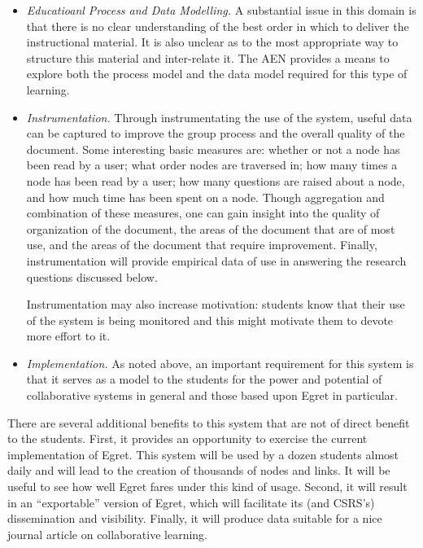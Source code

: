 \begin{itemize}
\item {\em Educatioanl Process and Data Modelling.} A substantial
  issue in this domain is that there is no clear understanding of the
  best order in which to deliver the instructional material.  It is
  also unclear as to the most appropriate way to structure this
  material and inter-relate it.  The AEN provides a means to explore
  both the process model and the data model required for this type of learning.
  
\item {\em Instrumentation.} Through instrumentating the use of the system,
  useful data can be captured to improve the group process and the overall
  quality of the document.  Some interesting basic measures are: whether or
  not a node has been read by a user; what order nodes are traversed in; how
  many times a node has been read by a user; how many questions are raised
  about a node, and how much time has been spent on a node. Though
  aggregation and combination of these measures, one can gain insight into
  the quality of organization of the document, the areas of the document that
  are of most use, and the areas of the document that require
  improvement.  Finally, instrumentation will provide empirical data
  of use in answering the research questions discussed below. 
  
  Instrumentation may also increase motivation: students know that
  their use of the system is being monitored and this might motivate
  them to devote more effort to it.
  
\item {\em Implementation.} As noted above, an important requirement for this
  system is that it serves as a model to the students for the power and
  potential of collaborative systems in general and those based upon Egret
  in particular.   


\end{itemize}

There are several additional benefits to this system that are not of direct
benefit to the students. First, it provides an opportunity to exercise the
current implementation of Egret.  This system will be used by a dozen
students almost daily and will lead to the creation of thousands of nodes
and links.  It will be useful to see how well Egret fares under this kind
of usage. Second, it will result in an ``exportable'' version of Egret,
which will facilitate its (and CSRS's) dissemination and visibility.
Finally, it will produce data suitable for a nice journal article on
collaborative learning.

